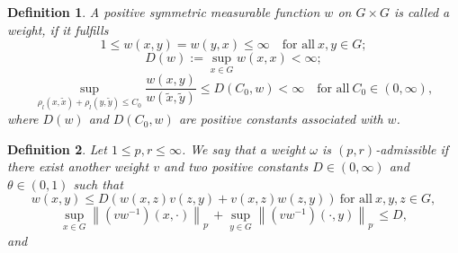 \documentclass[preprint,11pt]{elsarticle}
\newtheorem{definition}{Definition}[section]
\numberwithin{equation}{section}
\begin{document}
	\begin{definition}
		A positive symmetric measurable function $w$ on $G\times G$  is called a weight, if it fulfills
		\[1 \le  w \left( x,y \right )= w (y,x) \le \infty  \quad \text{for~all}~ x,y\in G;\]
		\[D(w):=\sup_{x\in G}w (x,x)<\infty ;\]
		\[\sup_{\rho_{l} (x,\tilde x)+\rho_{l}(y,\tilde y)\le C_{0} } \frac{w (x, y)}{w (\tilde x,\tilde y)}\le D(C_{0},w )<\infty \quad  \text{for~all}~ C_0\in (0,\infty),\]
		where $D(w)$ and $D(C_0, w)$ are positive constants associated with $w$.
		
	\end{definition}
	
	\begin{definition}
		Let $1\le p,r\le \infty$. We say that a weight $\omega $ is $\left (p,r  \right ) $-{\it admissible} if there exist another weight $v$ and two positive constants $D\in \left ( 0,\infty  \right ) $ and
		$ \theta \in \left ( 0,1 \right ) $ such that
		\begin{equation}\label{w1}
			w\left ( x,y \right ) \le  D\left ( w\left ( x,z \right ) v\left ( z,y \right ) +v\left ( x,z \right ) w\left ( z,y \right )  \right )~\text{for~all}~ x,y,z\in G,
		\end{equation}
		\begin{equation}\label{w22}
			\sup_{x\in G}\left \| (vw^{-1})\left ( x,\cdot \right ) \right \|_{p^{_{'}}} +\sup_{y\in G}\left \|( vw^{-1})\left ( \cdot,y \right ) \right \| _{p^{_{'}}}\le D,
		\end{equation}
		and
		\begin{equation}\label{w2}

\end{equation}
\end{definition}
\end{document}

